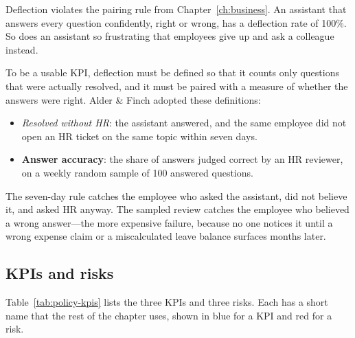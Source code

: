 \begin{watchout}
Deflection violates the pairing rule from Chapter~\ref{ch:business}. An assistant that answers every question confidently, right or wrong, has a deflection rate of 100\%. So does an assistant so frustrating that employees give up and ask a colleague instead.
\end{watchout}

To be a usable KPI, deflection must be defined so that it counts only questions that were actually resolved, and it must be paired with a measure of whether the answers were right. Alder \& Finch adopted these definitions:
\begin{itemize}[itemsep=1pt]
  \item \emph{Resolved without HR}: the assistant answered, and the same employee did not open an HR ticket on the same topic within seven days.
  \item \textbf{Answer accuracy}: the share of answers judged correct by an HR reviewer, on a weekly random sample of 100 answered questions.
\end{itemize}
The seven-day rule catches the employee who asked the assistant, did not believe it, and asked HR anyway. The sampled review catches the employee who believed a wrong answer---the more expensive failure, because no one notices it until a wrong expense claim or a miscalculated leave balance surfaces months later.

\subsection{KPIs and risks}

Table~\ref{tab:policy-kpis} lists the three KPIs and three risks. Each has a short name that the rest of the chapter uses, shown in blue for a KPI and red for a risk.


